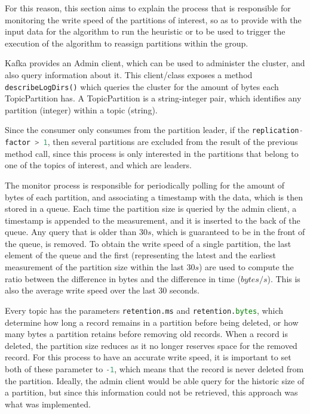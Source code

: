 For this reason, this section aims to explain the process that is responsible
for monitoring the write speed of the partitions of interest, so as to provide
with the input data for the algorithm to run the heuristic or to be used to
trigger the execution of the algorithm to reassign partitions within the group.

Kafka provides an Admin client, which can be used to administer the cluster, and
also query information about it. This client/class exposes a method
\lstinline[language=Python]{describeLogDirs()} which queries the cluster for the
amount of bytes each TopicPartition has. A TopicPartition is a string-integer
pair, which identifies any partition (integer) within a topic (string). 

Since the consumer only consumes from the partition leader, if the
\lstinline[language=Python]{replication-factor > 1}, then several partitions are
excluded from the result of the previous method call, since this process is only
interested in the partitions that belong to one of the topics of interest, and
which are leaders.

The monitor process is responsible for periodically polling for the amount of
bytes of each partition, and associating a timestamp with the data, which is
then stored in a queue. Each time the partition size is queried by the admin
client, a timestamp is appended to the measurement, and it is inserted to the
back of the queue. Any query that is older than $30s$, which is guaranteed to be
in the front of the queue, is removed. To obtain the write speed of a single
partition, the last element of the queue and the first (representing the latest
and the earliest measurement of the partition size within the last $30s$) are
used to compute the ratio between the difference in bytes and the difference in
time ($bytes/s$). This is also the average write speed over the last 30 seconds.

Every topic has the parameters \lstinline[language=Python]{retention.ms} and
\lstinline[language=Python]{retention.bytes}, which determine how long a record
remains in a partition before being deleted, or how many bytes a partition
retains before removing old records. When a record is deleted, the partition
size reduces as it no longer reserves space for the removed record. For this
process to have an accurate write speed, it is important to set both of these
parameter to \lstinline[language=Python]{-1}, which means that the record is
never deleted from the partition. Ideally, the admin client would be able query
for the historic size of a partition, but since this information could not be
retrieved, this approach was what was implemented.


